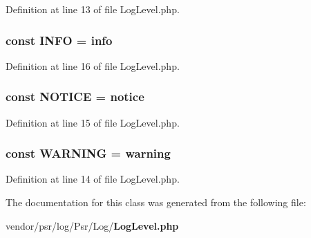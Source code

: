 Definition at line 13 of file Log\+Level.\+php.

\subsubsection[{I\+N\+F\+O}]{\setlength{\rightskip}{0pt plus 5cm}const I\+N\+F\+O = \textquotesingle{}info\textquotesingle{}}\label{class_psr_1_1_log_1_1_log_level_af2d1bd27ecbe33ecaadb558404e9c669}


Definition at line 16 of file Log\+Level.\+php.

\subsubsection[{N\+O\+T\+I\+C\+E}]{\setlength{\rightskip}{0pt plus 5cm}const N\+O\+T\+I\+C\+E = \textquotesingle{}notice\textquotesingle{}}\label{class_psr_1_1_log_1_1_log_level_a0b32ca69140ca26e6614dddf004ae3d9}


Definition at line 15 of file Log\+Level.\+php.

\subsubsection[{W\+A\+R\+N\+I\+N\+G}]{\setlength{\rightskip}{0pt plus 5cm}const W\+A\+R\+N\+I\+N\+G = \textquotesingle{}warning\textquotesingle{}}\label{class_psr_1_1_log_1_1_log_level_ad0c7ccd2f8b92a760391d21d0ec7b339}


Definition at line 14 of file Log\+Level.\+php.



The documentation for this class was generated from the following file\+:\begin{DoxyCompactItemize}
\item 
vendor/psr/log/\+Psr/\+Log/{\bf Log\+Level.\+php}\end{DoxyCompactItemize}
